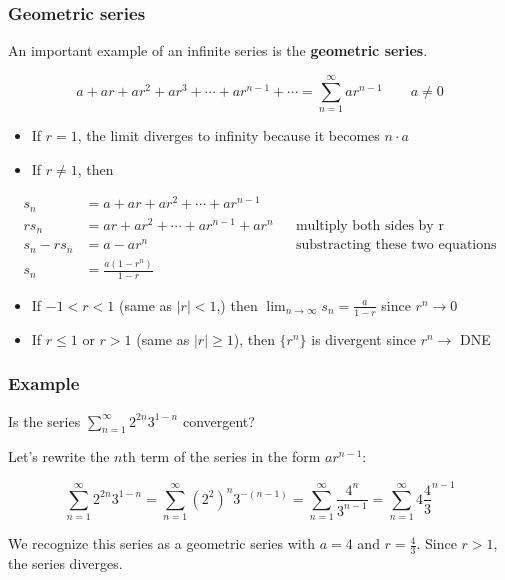\documentclass[t]{beamer}
\theoremstyle{plain}
\theoremstyle{definition}
\newcommand{\limm}[1]{\displaystyle \lim_{n\to #1}}
\begin{document}
\begin{frame}
\footnotesize
\frametitle{Geometric series}

An important example of an infinite series is the \textbf{geometric series}.

$$a + ar + ar^2 + ar^3 + \cdots + ar^{n-1} + \cdots = \sum_{n=1}^{\infty}ar^{n-1}  \qquad a \neq 0$$

\begin{itemize}
	\item If $r = 1$, the limit diverges to infinity because it becomes $n \cdot a$
	\item If $r \neq 1$, then 
\end{itemize}

\begin{align*}
	s_n &= a + ar + ar^2 + \cdots + ar^{n-1} \\
	rs_n &= ar + ar^2 + \cdots + ar^{n-1} + ar^n && \text{multiply both sides by r} \\
	s_n - rs_n &= a - ar^n && \text{substracting these two equations} \\
	s_n &= \frac{a(1-r^n)}{1 - r}
\end{align*}

\begin{itemize}
	\item If $-1 < r < 1$ (same as $|r| < 1$,)   then $\limm{\infty} s_n = \frac{a}{1-r}$ since $r^n \rightarrow 0$
	\item If $r \leq 1$ or $r > 1$ (same as $|r| \geq 1$), then $\{ r^n \}$ is divergent since $r^n \rightarrow $ DNE
\end{itemize}

\end{frame}


\begin{frame}
\frametitle{Example}

Is the series $\displaystyle\sum_{n=1}^{\infty}2^{2n}3^{1-n}$ convergent? \pause

\medskip

Let's rewrite the $n$th term of the series in the form $ar^{n-1}$:

$$\sum_{n=1}^{\infty} 2^{2n}3^{1-n} = \sum_{n=1}^{\infty}(2^2)^n 3^{-(n-1)} = \sum_{n=1}^{\infty} \frac{4^n}{3^{n-1}} = \sum_{n=1}^{\infty} 4 \frac{4}{3}^{n-1}$$

We recognize this series as a geometric series with $a = 4$ and $r = \frac{4}{3}$.    Since $r > 1$, the
series diverges.

\end{frame}
\end{document}
